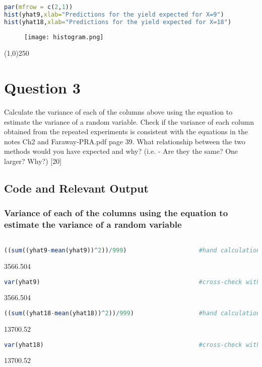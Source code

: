 \documentclass[a4paper]{article}
\begin{document}
\begin{lstlisting}[language=R]
par(mfrow = c(2,1))
hist(yhat9,xlab="Predictions for the yield expected for X=9")
hist(yhat18,xlab="Predictions for the yield expected for X=18")
\end{lstlisting}

\begin{figure}[H]
\centering
\texttt{[image: histogram.png]}
\end{figure}
\begin{center}
\line(1,0){250}
\end{center}
\pagebreak


\section{Question 3}
Calculate the variance of each of the columns above using the equation to estimate the variance of a random variable.  Check if the variance of each column obtained from the repeated experiments is consistent with the equations in the notes Ch2 and Faraway-PRA.pdf page 39.  What relationship between the two methods would you have expected and why? (i.e. - Are they the same? One larger? Why?) [20]

\subsection{Code and Relevant Output}

\subsubsection{Variance of each of the columns using the equation to estimate the variance of a random variable}
\begin{lstlisting}[language=R]

((sum((yhat9-mean(yhat9))^2))/999)                    #hand calculation#
\end{lstlisting}
3566.504
\begin{lstlisting}[language=R]
var(yhat9)                                            #cross-check with R function
\end{lstlisting}
3566.504
\begin{lstlisting}[language=R]
((sum((yhat18-mean(yhat18))^2))/999)                  #hand calculation#
\end{lstlisting}
13700.52
\begin{lstlisting}[language=R]
var(yhat18)                                           #cross-check with R function
\end{lstlisting}
13700.52
\linebreak
\end{document}
